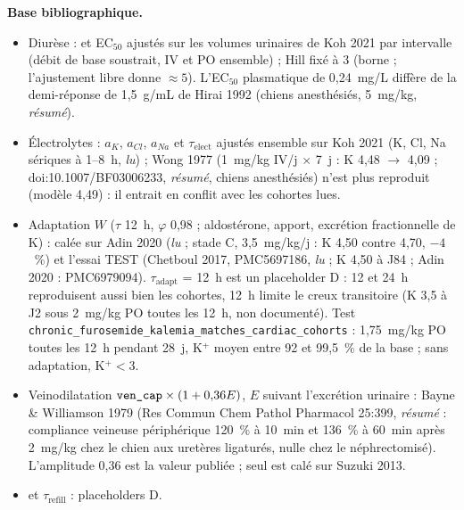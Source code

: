 \documentclass[10pt,a4paper]{article}
\newcommand{\cmd}[1]{\texttt{#1}}
\newcommand{\vp}[1]{\text{\texttt{\detokenize{#1}}}}
\newcommand{\acc}[1]{\textsl{#1}}
\newcommand{\sources}[1]{\par\textbf{Base bibliographique.} #1}
\begin{document}
\sources{
\begin{itemize}
\item Diurèse : \vp{urine_max} et EC$_{50}$ ajustés sur les volumes urinaires de Koh 2021 par intervalle (débit de base soustrait, IV et PO ensemble) ; Hill fixé à 3 (borne ; l'ajustement libre donne $\approx 5$). L'EC$_{50}$ plasmatique de 0,24~mg/L diffère de la demi-réponse de 1,5~\textmu g/mL de Hirai 1992 (chiens anesthésiés, 5~mg/kg, \acc{résumé}).
\item Électrolytes : $a_K$, $a_{Cl}$, $a_{Na}$ et $\tau_\text{elect}$ ajustés ensemble sur Koh 2021 (K, Cl, Na sériques à 1--8~h, \acc{lu}) ; Wong 1977 (1~mg/kg IV/j $\times$ 7~j : K 4,48 $\to$ 4,09 ; doi:10.1007/BF03006233, \acc{résumé}, chiens anesthésiés) n'est plus reproduit (modèle 4,49) : il entrait en conflit avec les cohortes lues.
\item Adaptation $W$ ($\tau$ 12~h, $\varphi$ 0,98 ; aldostérone, apport, excrétion fractionnelle de K) : calée sur Adin 2020 (\acc{lu} ; stade C, 3,5~mg/kg/j : K 4,50 contre 4,70, $-4$~\%) et l'essai TEST (Chetboul 2017, PMC5697186, \acc{lu} ; K 4,50 à J84 ; Adin 2020 : PMC6979094). $\tau_\text{adapt}$ = 12~h est un placeholder D : 12 et 24~h reproduisent aussi bien les cohortes, 12~h limite le creux transitoire (K 3,5 à J2 sous 2~mg/kg PO toutes les 12~h, non documenté). Test \cmd{chronic\_furosemide\_kalemia\_matches\_cardiac\_cohorts} : 1,75~mg/kg PO toutes les 12~h pendant 28~j, K$^+$ moyen entre 92 et 99,5~\% de la base ; sans adaptation, K$^+ < 3$.
\item Veinodilatation $\vp{ven_cap} \times (1 + 0{,}36E)$, $E$ suivant l'excrétion urinaire : Bayne \& Williamson 1979 (Res Commun Chem Pathol Pharmacol 25:399, \acc{résumé} : compliance veineuse périphérique 120~\% à 10~min et 136~\% à 60~min après 2~mg/kg chez le chien aux uretères ligaturés, nulle chez le néphrectomisé). L'amplitude 0,36 est la valeur publiée ; seul \vp{mr_k} est calé sur Suzuki 2013.
\item \vp{f_plasma} et $\tau_\text{refill}$ : placeholders D.
\end{itemize}}
\end{document}

